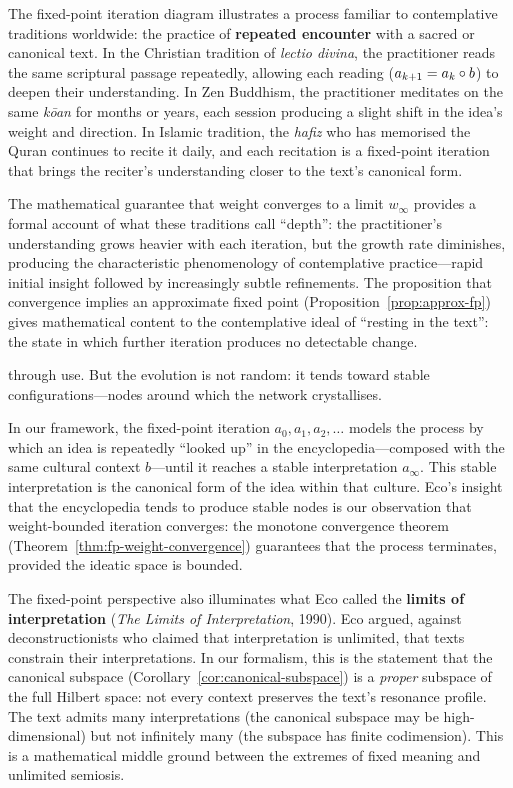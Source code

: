 \begin{interpretation}
\begin{interpretation}
\label{interp:ch10:fp_iteration_spiritual}
The fixed-point iteration diagram illustrates a process familiar to
contemplative traditions worldwide: the practice of \textbf{repeated
encounter} with a sacred or canonical text.  In the Christian tradition of
\emph{lectio divina}, the practitioner reads the same scriptural passage
repeatedly, allowing each reading ($a_{k+1} = a_k \circ b$) to deepen
their understanding.  In Zen Buddhism, the practitioner meditates on the
same \emph{k\=oan} for months or years, each session producing a slight
shift in the idea's weight and direction.  In Islamic tradition, the
\emph{hafiz} who has memorised the Quran continues to recite it daily,
and each recitation is a fixed-point iteration that brings the reciter's
understanding closer to the text's canonical form.

The mathematical guarantee that weight converges to a limit $w_\infty$
provides a formal account of what these traditions call ``depth'': the
practitioner's understanding grows heavier with each iteration, but the
growth rate diminishes, producing the characteristic phenomenology of
contemplative practice---rapid initial insight followed by increasingly
subtle refinements.  The proposition that convergence implies an
approximate fixed point (Proposition~\ref{prop:approx-fp}) gives
mathematical content to the contemplative ideal of ``resting in the text'':
the state in which further iteration produces no detectable change.
\end{interpretation}


through use.  But the evolution is not random: it tends toward stable
configurations---nodes around which the network crystallises.

In our framework, the fixed-point iteration $a_0, a_1, a_2, \ldots$ models
the process by which an idea is repeatedly ``looked up'' in the
encyclopedia---composed with the same cultural context $b$---until it reaches
a stable interpretation $a_\infty$.  This stable interpretation is the
canonical form of the idea within that culture.  Eco's insight that the
encyclopedia tends to produce stable nodes is our observation that
weight-bounded iteration converges: the monotone convergence theorem
(Theorem~\ref{thm:fp-weight-convergence}) guarantees that the process
terminates, provided the ideatic space is bounded.

The fixed-point perspective also illuminates what Eco called the
\textbf{limits of interpretation} (\emph{The Limits of Interpretation},
1990).  Eco argued, against deconstructionists who claimed that
interpretation is unlimited, that texts constrain their interpretations.  In
our formalism, this is the statement that the canonical subspace
(Corollary~\ref{cor:canonical-subspace}) is a \emph{proper} subspace of the
full Hilbert space: not every context preserves the text's resonance profile.
The text admits many interpretations (the canonical subspace may be
high-dimensional) but not infinitely many (the subspace has finite
codimension).  This is a mathematical middle ground between the extremes of
fixed meaning and unlimited semiosis.
\end{interpretation}



